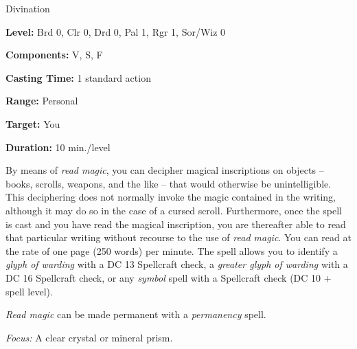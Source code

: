 
Divination

\textbf{Level:} Brd 0, Clr 0, Drd 0, Pal 1, Rgr 1, Sor/Wiz 0

\textbf{Components:} V, S, F

\textbf{Casting Time:} 1 standard action

\textbf{Range:} Personal

\textbf{Target:} You

\textbf{Duration:} 10 min./level

By means of \textit{read magic}, you can decipher magical inscriptions on objects -- books, 
scrolls, weapons, and the like -- that would otherwise be unintelligible. This deciphering 
does not normally invoke the magic contained in the writing, although it may do 
so in the case of a cursed scroll. Furthermore, once the spell is cast and you 
have read the magical inscription, you are thereafter able to read that particular 
writing without recourse to the use of \textit{read magic}. You can read at the 
rate of one page (250 words) per minute. The spell allows you to identify a \textit{glyph 
of warding} with a DC 13 Spellcraft check, a \textit{greater glyph of warding} with 
a DC 16 Spellcraft check, or any \textit{symbol} spell with a Spellcraft check 
(DC 10 + spell level).

\textit{Read magic} can be made permanent with a \textit{permanency} spell.

\textit{Focus:} A clear crystal or mineral prism.

